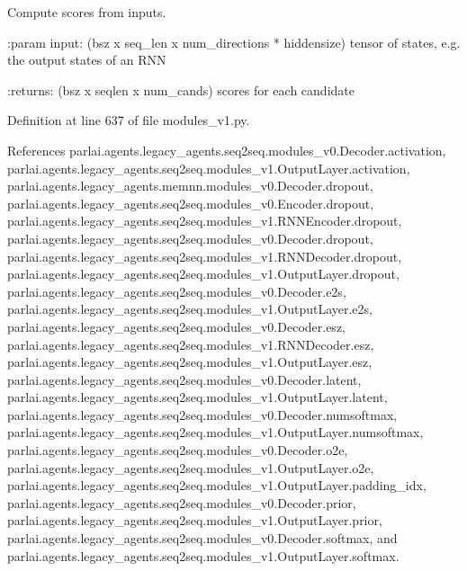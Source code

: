 \begin{DoxyVerb}Compute scores from inputs.

:param input: (bsz x seq_len x num_directions * hiddensize) tensor of
       states, e.g. the output states of an RNN

:returns: (bsz x seqlen x num_cands) scores for each candidate
\end{DoxyVerb}
 

Definition at line 637 of file modules\+\_\+v1.\+py.



References parlai.\+agents.\+legacy\+\_\+agents.\+seq2seq.\+modules\+\_\+v0.\+Decoder.\+activation, parlai.\+agents.\+legacy\+\_\+agents.\+seq2seq.\+modules\+\_\+v1.\+Output\+Layer.\+activation, parlai.\+agents.\+legacy\+\_\+agents.\+memnn.\+modules\+\_\+v0.\+Decoder.\+dropout, parlai.\+agents.\+legacy\+\_\+agents.\+seq2seq.\+modules\+\_\+v0.\+Encoder.\+dropout, parlai.\+agents.\+legacy\+\_\+agents.\+seq2seq.\+modules\+\_\+v1.\+R\+N\+N\+Encoder.\+dropout, parlai.\+agents.\+legacy\+\_\+agents.\+seq2seq.\+modules\+\_\+v0.\+Decoder.\+dropout, parlai.\+agents.\+legacy\+\_\+agents.\+seq2seq.\+modules\+\_\+v1.\+R\+N\+N\+Decoder.\+dropout, parlai.\+agents.\+legacy\+\_\+agents.\+seq2seq.\+modules\+\_\+v1.\+Output\+Layer.\+dropout, parlai.\+agents.\+legacy\+\_\+agents.\+seq2seq.\+modules\+\_\+v0.\+Decoder.\+e2s, parlai.\+agents.\+legacy\+\_\+agents.\+seq2seq.\+modules\+\_\+v1.\+Output\+Layer.\+e2s, parlai.\+agents.\+legacy\+\_\+agents.\+seq2seq.\+modules\+\_\+v0.\+Decoder.\+esz, parlai.\+agents.\+legacy\+\_\+agents.\+seq2seq.\+modules\+\_\+v1.\+R\+N\+N\+Decoder.\+esz, parlai.\+agents.\+legacy\+\_\+agents.\+seq2seq.\+modules\+\_\+v1.\+Output\+Layer.\+esz, parlai.\+agents.\+legacy\+\_\+agents.\+seq2seq.\+modules\+\_\+v0.\+Decoder.\+latent, parlai.\+agents.\+legacy\+\_\+agents.\+seq2seq.\+modules\+\_\+v1.\+Output\+Layer.\+latent, parlai.\+agents.\+legacy\+\_\+agents.\+seq2seq.\+modules\+\_\+v0.\+Decoder.\+numsoftmax, parlai.\+agents.\+legacy\+\_\+agents.\+seq2seq.\+modules\+\_\+v1.\+Output\+Layer.\+numsoftmax, parlai.\+agents.\+legacy\+\_\+agents.\+seq2seq.\+modules\+\_\+v0.\+Decoder.\+o2e, parlai.\+agents.\+legacy\+\_\+agents.\+seq2seq.\+modules\+\_\+v1.\+Output\+Layer.\+o2e, parlai.\+agents.\+legacy\+\_\+agents.\+seq2seq.\+modules\+\_\+v1.\+Output\+Layer.\+padding\+\_\+idx, parlai.\+agents.\+legacy\+\_\+agents.\+seq2seq.\+modules\+\_\+v0.\+Decoder.\+prior, parlai.\+agents.\+legacy\+\_\+agents.\+seq2seq.\+modules\+\_\+v1.\+Output\+Layer.\+prior, parlai.\+agents.\+legacy\+\_\+agents.\+seq2seq.\+modules\+\_\+v0.\+Decoder.\+softmax, and parlai.\+agents.\+legacy\+\_\+agents.\+seq2seq.\+modules\+\_\+v1.\+Output\+Layer.\+softmax.



